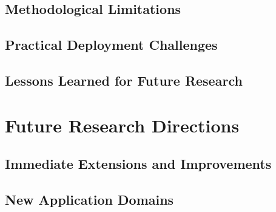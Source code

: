 \subsection{Methodological Limitations}

\subsection{Practical Deployment Challenges}

\subsection{Lessons Learned for Future Research}

\section{Future Research Directions}

\subsection{Immediate Extensions and Improvements}

\subsection{New Application Domains}

